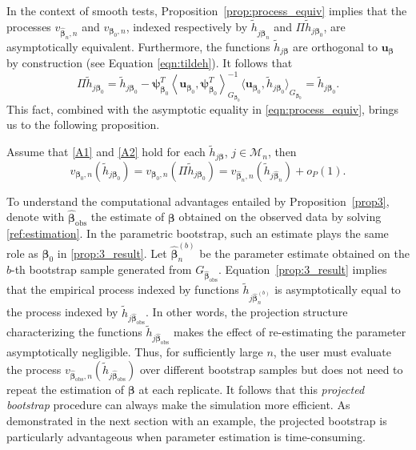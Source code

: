 \documentclass[11pt]{article}
\newcommand{\vect}[1]{\boldsymbol{#1}}
\newcommand{\inner}[1]{\left\langle #1 \right\rangle}
\begin{document}
In the context of smooth tests, Proposition~\ref{prop:process_equiv} implies that the processes $v_{\widehat{\vect{\beta}}_n,n}$ and $v_{{\vect{\beta}}_0,n}$, indexed respectively by $\widetilde{h}_{j\widehat{\vect{\beta}}_n}$ and $\Pi \widetilde{h}_{j\vect{\beta}_0}$, are asymptotically equivalent. Furthermore, the functions $\widetilde{h}_{j\vect{\beta}}$ are orthogonal to $\vect{u}_{\vect{\beta}}$ by construction (see Equation \eqref{eqn:tildeh}). It follows that 
$$\Pi \widetilde{h}_{j\vect{\beta}_0} 
= \widetilde{h}_{j \vect{\beta}_0} - \vect{\psi}_{\vect{\beta}_0}^T\inner{\vect{u}_{\vect{\beta}_0},\vect{\psi}^T_{\vect{\beta}_0}}^{-1}_{G_{\vect{\beta}_0}}\bigl\langle{\vect{u}_{\vect{\beta}_0},\widetilde{h}_{j \vect{\beta}_0}\bigl\rangle}_{G_{\vect{\beta}_0}} 
= \widetilde{h}_{j\vect{\beta}_0}.$$ 
This fact, combined with the asymptotic equality in \eqref{eqn:process_equiv}, brings us to the following proposition.
\begin{prop} \label{prop3}
Assume that \ref{A1} and \ref{A2} hold for each $\widetilde{h}_{j\vect{\beta}}$, $j\in\mathcal{M}_n$, then 
\begin{equation}\label{prop:3_result}
v_{\vect{\beta}_0,n}( \widetilde{h}_{j\vect{\beta}_0}) = v_{\vect{\beta}_0,n}(\Pi \widetilde{h}_{j\vect{\beta}_0}) = v_{\widehat{\vect{\beta}}_n,n}(\widetilde{h}_{j\widehat{\vect{\beta}}_n}) +o_P(1). 
\end{equation}
\end{prop}
To understand the computational advantages entailed by Proposition~\ref{prop3}, denote with $\widehat{\vect{\beta}}_{\text{obs}}$ the estimate of $\vect{\beta}$ obtained on the observed data by solving \eqref{ref:estimation}. In the parametric bootstrap, such an estimate plays the same role as $\vect{\beta}_0$ in \eqref{prop:3_result}. Let $\widehat{\vect{\beta}}_n^{(b)}$ be the parameter estimate obtained on the $b$-th bootstrap sample generated from  $G_{\widehat{\vect{\beta}}_{\text{obs}}}.$ Equation~\eqref{prop:3_result}  implies that the empirical process indexed by functions    $\widetilde{h}_{j\widehat{\vect{\beta}}^{(b)}_n}$ is asymptotically equal to the process indexed by $\widetilde{h}_{j\widehat{\vect{\beta}}_{\text{obs}}}$. In other words, the projection structure characterizing the functions $\widetilde{h}_{j\widehat{\vect{\beta}}_{\text{obs}}}$ makes the effect of re-estimating the parameter asymptotically negligible. Thus, for sufficiently large $n$, the user must evaluate the process $v_{\widehat{\vect{\beta}}_{\text{obs}},n}(\widetilde{h}_{j\widehat{\vect{\beta}}_{\text{obs}}})$ over different bootstrap samples but does not need to repeat the estimation of $\vect{\beta}$ at each replicate. 
It follows that this \emph{projected bootstrap} procedure 
can always make the simulation more efficient. As demonstrated in the next section with an example, the projected bootstrap is particularly advantageous when parameter estimation is time-consuming. 
\end{document}
